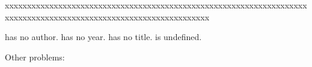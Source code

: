 \documentclass{article}
\begin{document}
xxxxxxxxxxxxxxxxxxxxxxxxxxxxxxxxxxxxxxxxxxxxxxxxxxxxxxxxxxxxxxxxxxxxxxxxxxxxxxxxxxxxxxxxxxxxxxxxxxxxxxxxxxxxxxxxxx

\cite{noauthor} has no author.
\cite{noyear} has no year.
\cite{notitle} has no title.
\cite{undefined} is undefined.

Other problems:
\cite{missing-comma}



\end{document}
